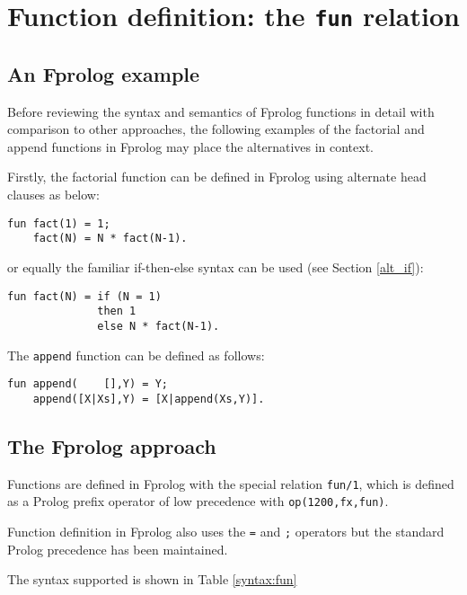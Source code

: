 \documentclass[a4paper,11pt,twoside]{article}
\begin{document}
\section{Function definition: the \texttt{fun} relation} %
\label{definition}
\enlargethispage{-2\baselineskip} %

\subsection{An Fprolog example}

Before reviewing the syntax and semantics of Fprolog functions in detail with
comparison to other approaches, the following examples of the factorial and
append functions in Fprolog may place the alternatives in context.

Firstly, the factorial function can be defined in Fprolog using alternate head clauses as below:
\begin{verbatim}
fun fact(1) = 1;
    fact(N) = N * fact(N-1).
\end{verbatim}
or equally the familiar if-then-else syntax can be used (see Section \ref{alt_if}):
\begin{verbatim}
fun fact(N) = if (N = 1)
              then 1
              else N * fact(N-1).
\end{verbatim}
The \texttt{append} function can be defined as follows:
\begin{verbatim}
fun append(    [],Y) = Y;
    append([X|Xs],Y) = [X|append(Xs,Y)].
\end{verbatim}

\subsection{The Fprolog approach}

Functions are defined in Fprolog with the special relation
\texttt{fun/1}, which is defined as a Prolog
prefix operator of low precedence with \texttt{op(1200,fx,fun)}.

Function definition in Fprolog also uses the \texttt{=} and \texttt{;}
operators but the standard Prolog precedence has been maintained.

The syntax supported is shown in Table \ref{syntax:fun}
\end{document}

